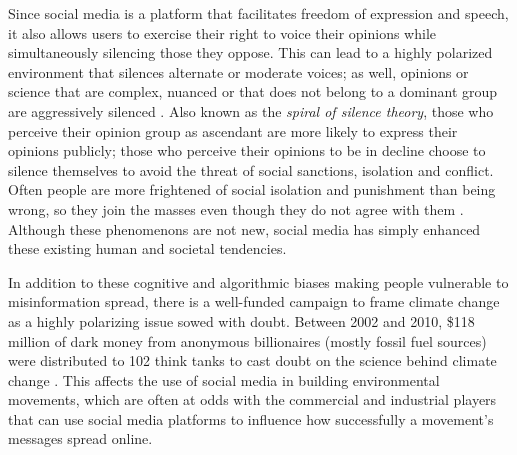 \documentclass{article}
\begin{document}
Since social media is a platform that facilitates freedom of expression and speech, it also allows users to exercise their right to voice their opinions while simultaneously silencing those they oppose. This can lead to a highly polarized environment that silences alternate or moderate voices; as well, opinions or science that are complex, nuanced or that does not belong to a dominant group are aggressively silenced \cite{lim2017freedom}. Also known as the \textit{spiral of silence theory}, those who perceive their opinion group as ascendant are more likely to express their opinions publicly; those who perceive their opinions to be in decline choose to silence themselves to avoid the threat of social sanctions, isolation and conflict. Often people are more frightened of social isolation and punishment than being wrong, so they join the masses even though they do not agree with them \cite{noelle1974spiral}. Although these phenomenons are not new, social media has simply enhanced these existing human and societal tendencies.

In addition to these cognitive and algorithmic biases making people vulnerable to misinformation spread, there is a well-funded campaign to frame climate change as a highly polarizing issue sowed with doubt. Between 2002 and 2010, \$118 million of dark money from anonymous billionaires (mostly fossil fuel sources) were distributed to 102 think tanks to cast doubt on the science behind climate change \cite{guardian2018darkmoney}. This affects the use of social media in building environmental movements, which are often at odds with the commercial and industrial players that can use social media platforms to influence how successfully a movement’s messages spread online. 




\end{document}
